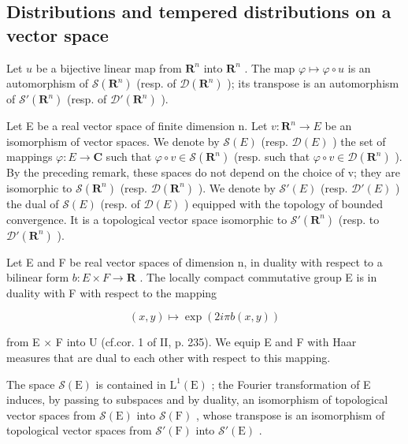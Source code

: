 \subsection{Distributions and tempered distributions on a vector space}

Let \(u\) be a bijective linear map from \(\mathbf{R}^{n}\) into \(\mathbf{R}^{n}\) . The map \(\varphi \mapsto \varphi \circ u\) is an automorphism of \(\mathcal{S}(\mathbf{R}^{n})\) (resp. of \(\mathcal{D}(\mathbf{R}^{n})\) ); its transpose is an automorphism of \(\mathcal{S}'(\mathbf{R}^{n})\) (resp. of \(\mathcal{D}'(\mathbf{R}^{n})\) ).

Let E be a real vector space of finite dimension n. Let \(v: \mathbf{R}^{n} \to E\) be an isomorphism of vector spaces. We denote by \(\mathcal{S}(E)\) (resp. \(\mathcal{D}(E)\) ) the set of mappings \(\varphi: E \to \mathbf{C}\) such that \(\varphi \circ v \in \mathcal{S}(\mathbf{R}^{n})\) (resp. such that \(\varphi \circ v \in \mathcal{D}(\mathbf{R}^{n})\) ). By the preceding remark, these spaces do not depend on the choice of v; they are isomorphic to \(\mathcal{S}(\mathbf{R}^{n})\) (resp. \(\mathcal{D}(\mathbf{R}^{n})\) ). We denote by \(\mathcal{S}'(E)\) (resp. \(\mathcal{D}'(E)\) ) the dual of \(\mathcal{S}(E)\) (resp. of \(\mathcal{D}(E)\) ) equipped with the topology of bounded convergence. It is a topological vector space isomorphic to \(\mathcal{S}'(\mathbf{R}^{n})\) (resp. to \(\mathcal{D}'(\mathbf{R}^{n})\) ).

Let E and F be real vector spaces of dimension n, in duality with respect to a bilinear form \(b: E \times F \to \mathbf{R}\) . The locally compact commutative group E is in duality with F with respect to the mapping

\[
(x, y) \mapsto \exp (2 i \pi b (x, y))
\]

from E × F into U (cf.cor. 1 of II, p. 235). We equip E and F with Haar measures that are dual to each other with respect to this mapping.

The space \(\mathcal{S}(\mathrm{E})\) is contained in \(\mathrm{L}^1 (\mathrm{E})\) ; the Fourier transformation of E induces, by passing to subspaces and by duality, an isomorphism of topological vector spaces from \(\mathcal{S}(\mathrm{E})\) into \(\mathcal{S}(\mathrm{F})\) , whose transpose is an isomorphism of topological vector spaces from \(\mathcal{S}'(\mathrm{F})\) into \(\mathcal{S}'(\mathrm{E})\) .

